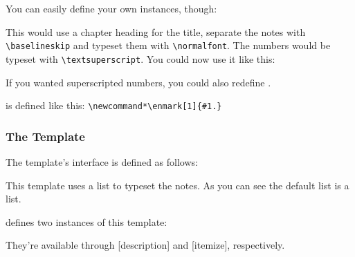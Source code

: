 \documentclass[toc=bib,toc=index]{cnpkgdoc}
\begin{document}
You can easily define your own instances, though:
This would use a chapter heading for the title, separate the notes with
\verb=\baselineskip= and typeset them with \verb=\normalfont=. The numbers would
be typeset with \verb=\textsuperscript=. You could now use it like this:
\begin{beispiel}
 \printendnotes[custom]
\end{beispiel}

If you wanted superscripted numbers, you could also redefine . 
\begin{beschreibung}
 \newline
   is defined like this: \verb=\newcommand*\enmark[1]{#1.}=
\end{beschreibung}

\subsubsection{The  Template}
The  template's interface is defined as follows:
This template uses a list to typeset the notes. As you can see the default list
is a  list.

\enotez defines two instances of this template:
\begin{beispiel}
\end{beispiel}
They're available through [description] and
[itemize], respectively.
\end{document}
